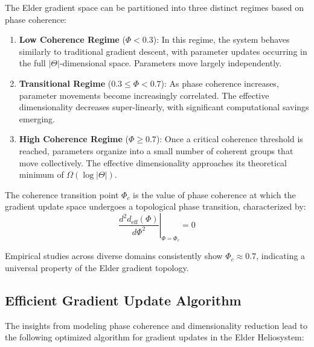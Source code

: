 The Elder gradient space can be partitioned into three distinct regimes based on phase coherence:

\begin{enumerate}
    \item \textbf{Low Coherence Regime} ($\Phi < 0.3$): In this regime, the system behaves similarly to traditional gradient descent, with parameter updates occurring in the full $|\Theta|$-dimensional space. Parameters move largely independently.
    
    \item \textbf{Transitional Regime} ($0.3 \leq \Phi < 0.7$): As phase coherence increases, parameter movements become increasingly correlated. The effective dimensionality decreases super-linearly, with significant computational savings emerging.
    
    \item \textbf{High Coherence Regime} ($\Phi \geq 0.7$): Once a critical coherence threshold is reached, parameters organize into a small number of coherent groups that move collectively. The effective dimensionality approaches its theoretical minimum of $\Omega(\log|\Theta|)$.
\end{enumerate}

\begin{definition}
The coherence transition point $\Phi_c$ is the value of phase coherence at which the gradient update space undergoes a topological phase transition, characterized by:
\begin{equation}
\left. \frac{d^2 d_{\text{eff}}(\Phi)}{d\Phi^2} \right|_{\Phi=\Phi_c} = 0
\end{equation}
\end{definition}

Empirical studies across diverse domains consistently show $\Phi_c \approx 0.7$, indicating a universal property of the Elder gradient topology.



\subsection{Efficient Gradient Update Algorithm}

The insights from modeling phase coherence and dimensionality reduction lead to the following optimized algorithm for gradient updates in the Elder Heliosystem:

